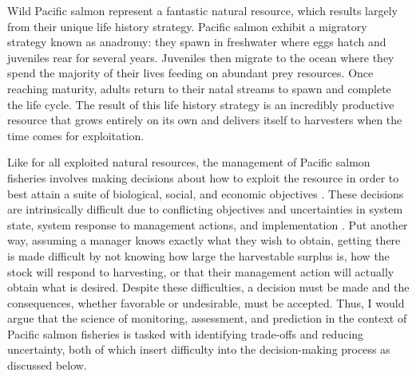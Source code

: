 \documentclass[12pt,]{book}
\theoremstyle{definition}
\theoremstyle{definition}
\theoremstyle{definition}
\theoremstyle{remark}
\begin{document}
Wild Pacific salmon represent a fantastic natural resource, which
results largely from their unique life history strategy. Pacific salmon
exhibit a migratory strategy known as anadromy: they spawn in freshwater
where eggs hatch and juveniles rear for several years. Juveniles then
migrate to the ocean where they spend the majority of their lives
feeding on abundant prey resources. Once reaching maturity, adults
return to their natal streams to spawn and complete the life cycle. The
result of this life history strategy is an incredibly productive
resource that grows entirely on its own and delivers itself to
harvesters when the time comes for exploitation.

Like for all exploited natural resources, the management of Pacific
salmon fisheries involves making decisions about how to exploit the
resource in order to best attain a suite of biological, social, and
economic objectives \citep{walters-1986}. These decisions are
intrinsically difficult due to conflicting objectives and uncertainties
in system state, system response to management actions, and
implementation \citep{walters-holling-1990}. Put another way, assuming a
manager knows exactly what they wish to obtain, getting there is made
difficult by not knowing how large the harvestable surplus is, how the
stock will respond to harvesting, or that their management action will
actually obtain what is desired. Despite these difficulties, a decision
must be made \citep[without decision-making there is no
management;][]{hilborn-walters-1992} and the consequences, whether
favorable or undesirable, must be accepted. Thus, I would argue that the
science of monitoring, assessment, and prediction in the context of
Pacific salmon fisheries is tasked with identifying trade-offs and
reducing uncertainty, both of which insert difficulty into the
decision-making process as discussed below.
\end{document}
